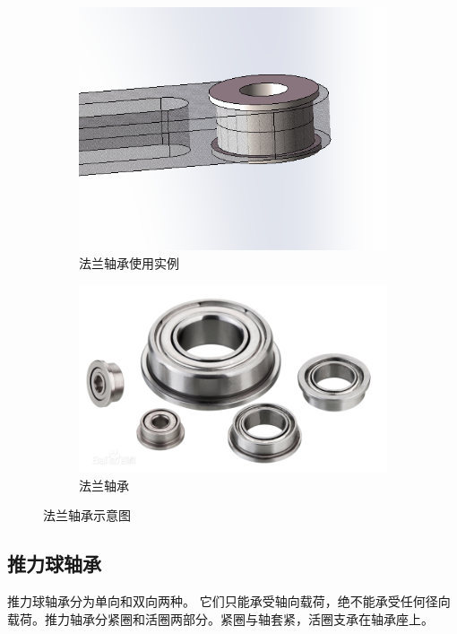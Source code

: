 \documentclass[UTF8]{article} %
\begin{document}
\begin{figure}[H]
  \centering
  \begin{subfigure}[b]{0.3\textwidth}
         \centering
         \includegraphics[width=\textwidth]{zhou3.png}
          \caption{法兰轴承使用实例}
  \end{subfigure}
  \quad
  \begin{subfigure}[b]{0.3\textwidth}
          \centering
          \includegraphics[width=\textwidth]{zhou4.png}
          \caption{法兰轴承}
  \end{subfigure}
  \caption{法兰轴承示意图}
\end{figure}

\subsection{推力球轴承}
推力球轴承分为单向和双向两种。 它们只能承受轴向载荷，绝不能承受任何径向载荷。推力轴承分紧圈和活圈两部分。紧圈与轴套紧，活圈支承在轴承座上。
\end{document}
